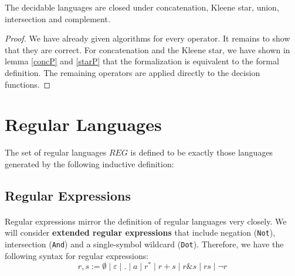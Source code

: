 
    \begin{theorem}{}
        \label{DecLangClosed}
        The decidable languages are closed under concatenation, Kleene star, union, intersection and complement. 
    \end{theorem}
    \begin{proof}
        We have already given algorithms for every operator. 
        It remains to show that they are correct.
        For concatenation and the Kleene star, we have shown in lemma \ref{concP} and \ref{starP} that the formalization is equivalent to the formal definition. 
        The remaining operators are applied directly to the decision functions. 
    \end{proof}

    \paragraph{}


    \section{Regular Languages}


    \begin{definition}{}
        \label{REG}
        The set of regular languages $REG$ is defined to be exactly those languages generated by the following inductive definition:
        
    \end{definition}


    \subsection{Regular Expressions}

    \paragraph{} 
    Regular expressions mirror the definition of regular languages very closely. 
    We will consider \textbf{extended regular expressions} that include negation (\lstinline{Not}), intersection (\lstinline{And}) and a single-symbol wildcard (\lstinline{Dot}). 
    Therefore, we have the following syntax for regular expressions:
    \begin{equation*}
        r,s := \emptyset \; | \; \varepsilon \; | \; . \; | \; a \; | \; r^* \; | \; r + s \; | \; r \& s \; | \; r s \; | \; \neg r
    \end{equation*}

